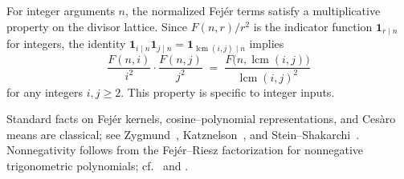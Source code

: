 \begin{remark}
For integer arguments $n$, the normalized Fejér terms satisfy a multiplicative property on the divisor lattice. Since $F(n,r)/r^2$ is the indicator function $\mathbf{1}_{r\mid n}$ for integers, the identity $\mathbf{1}_{i\mid n}\mathbf{1}_{j\mid n}=\mathbf{1}_{\operatorname{lcm}(i,j)\mid n}$ implies
\[
\frac{F(n,i)}{i^2}\cdot \frac{F(n,j)}{j^2}\;=\;\frac{F\bigl(n,\operatorname{lcm}(i,j)\bigr)}{\operatorname{lcm}(i,j)^2}
\]
for any integers $i,j\ge 2$. This property is specific to integer inputs.
\end{remark}

\begin{remark}
Standard facts on Fejér kernels, cosine–polynomial representations, and Cesàro means are classical; see Zygmund~\cite[Chap.~I, §5; Chap.~III]{zygmund2002}, Katznelson~\cite[Chap.~I]{katznelson2004}, and Stein–Shakarchi~\cite[Chap.~2]{stein2003}. Nonnegativity follows from the Fejér–Riesz factorization for nonnegative trigonometric polynomials; cf.\ \cite[Chap.~V]{zygmund2002} and \cite[Chap.~II]{katznelson2004}.
\end{remark}


